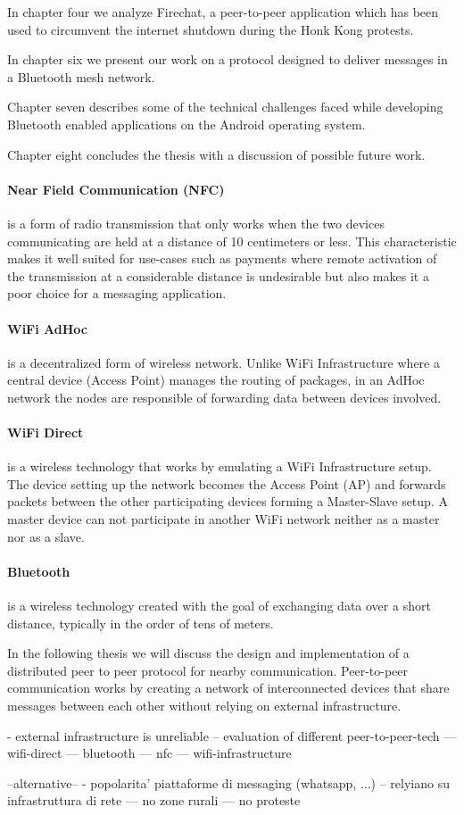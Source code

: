 In chapter four we analyze Firechat, a peer-to-peer application which has been used to circumvent the internet shutdown during the Honk Kong protests.

In chapter six we present our work on a protocol designed to deliver messages in a Bluetooth mesh network.

Chapter seven describes some of the technical challenges faced while developing Bluetooth enabled applications on the Android operating system.

Chapter eight concludes the thesis with a discussion of possible future work.


\paragraph{Near Field Communication (NFC)}
is a form of radio transmission that only works when the two devices communicating are held at a distance of 10 centimeters or less. 
This characteristic makes it well suited for use-cases such as payments where remote activation of the transmission at a considerable distance is undesirable but also makes it a poor choice for a messaging application.

\paragraph{WiFi AdHoc} 
is a decentralized form of wireless network. Unlike WiFi Infrastructure where a central device (Access Point) manages the routing of packages, in an AdHoc network the nodes are responsible of forwarding data between devices involved.

\paragraph{WiFi Direct}
is a wireless technology that works by emulating a WiFi Infrastructure setup. The device setting up the network becomes the Access Point (AP) and forwards packets between the other participating devices forming a Master-Slave setup.
A master device can not participate in another WiFi network neither as a master nor as a slave.

\paragraph{Bluetooth}
is a wireless technology created with the goal of exchanging data over a short distance, typically in the order of tens of meters.



In the following thesis we will discuss the design and implementation of a distributed peer to peer protocol for nearby communication.
Peer-to-peer communication works by creating a network of interconnected devices that share messages between each other without relying on external infrastructure.

- external infrastructure is unreliable
-- evaluation of different peer-to-peer-tech
--- wifi-direct
--- bluetooth
--- nfc
--- wifi-infrastructure


--alternative--
- popolarita' piattaforme di messaging (whatsapp, ...)
-- relyiano su infrastruttura di rete
--- no zone rurali
--- no proteste
